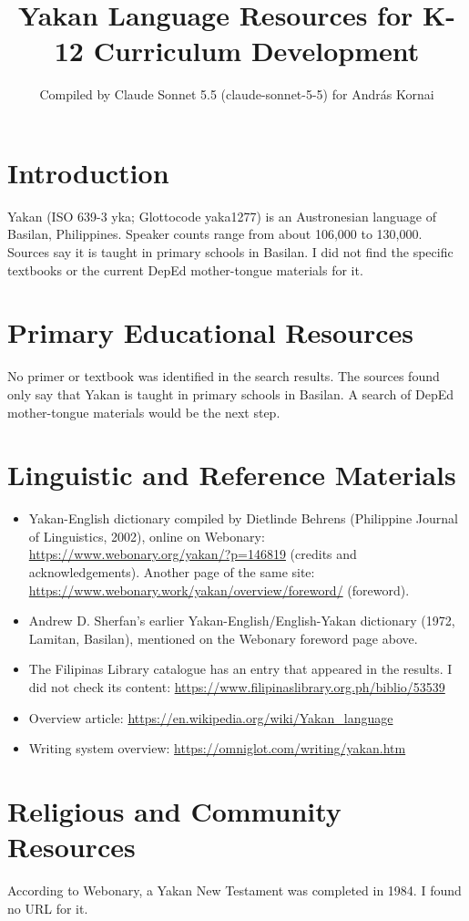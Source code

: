 \documentclass[12pt]{article}
\title{Yakan Language Resources for K-12 Curriculum Development}
\author{Compiled by Claude Sonnet 5.5 (claude-sonnet-5-5) for Andr\'as Kornai}
\date{}
\begin{document}
\maketitle

\section{Introduction}
Yakan (ISO 639-3 yka; Glottocode yaka1277) is an Austronesian language of Basilan, Philippines. Speaker counts range from about 106,000 to 130,000. Sources say it is taught in primary schools in Basilan. I did not find the specific textbooks or the current DepEd mother-tongue materials for it.

\section{Primary Educational Resources}
No primer or textbook was identified in the search results. The sources found only say that Yakan is taught in primary schools in Basilan. A search of DepEd mother-tongue materials would be the next step.

\section{Linguistic and Reference Materials}
\begin{itemize}
\item Yakan-English dictionary compiled by Dietlinde Behrens (Philippine Journal of Linguistics, 2002), online on Webonary: \url{https://www.webonary.org/yakan/?p=146819} (credits and acknowledgements). Another page of the same site: \url{https://www.webonary.work/yakan/overview/foreword/} (foreword).
\item Andrew D. Sherfan's earlier Yakan-English/English-Yakan dictionary (1972, Lamitan, Basilan), mentioned on the Webonary foreword page above.
\item The Filipinas Library catalogue has an entry that appeared in the results. I did not check its content: \url{https://www.filipinaslibrary.org.ph/biblio/53539}
\item Overview article: \url{https://en.wikipedia.org/wiki/Yakan_language}
\item Writing system overview: \url{https://omniglot.com/writing/yakan.htm}
\end{itemize}

\section{Religious and Community Resources}
According to Webonary, a Yakan New Testament was completed in 1984. I found no URL for it.
\end{document}
